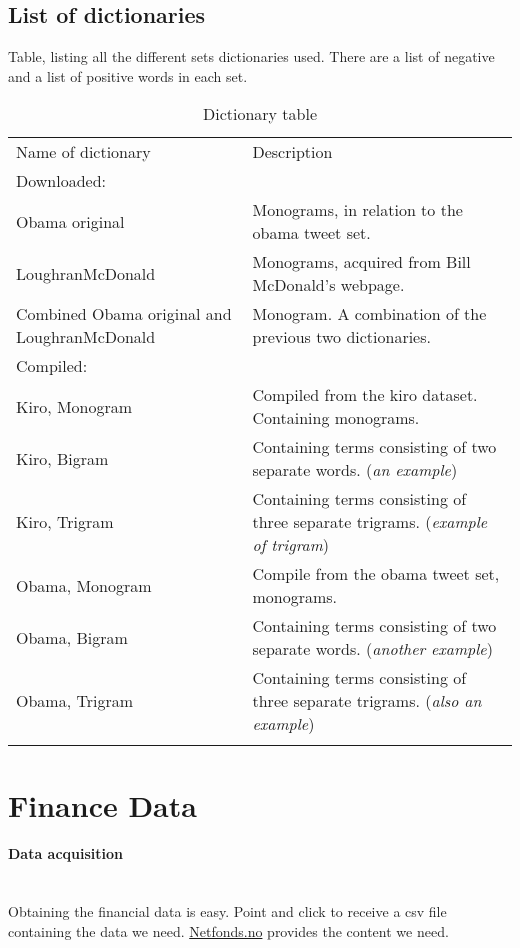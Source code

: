 \subsection{List of dictionaries}
Table, listing all the different sets dictionaries used. There are a list of
negative and a list of positive words in each set. 

\begin{table}
\centering
\label{tbl:dictionaries}
\caption{Dictionary table}
\begin{tabular}{ p{5cm} p{7cm} }
Name of dictionary & Description \\
Downloaded:& \\
\hline
Obama original & Monograms, in relation to the obama tweet set. \\
LoughranMcDonald & Monograms, acquired from Bill McDonald's webpage.\\
Combined Obama original and LoughranMcDonald & Monogram. A combination of
the previous two dictionaries. \\

Compiled:& \\
\hline
Kiro, Monogram & Compiled from the kiro dataset. Containing
monograms. \\
Kiro, Bigram &  Containing terms consisting of two separate words. (\textit{an 
example}) \\
Kiro, Trigram & Containing terms consisting of three separate trigrams.
(\textit{example of trigram})\\
Obama, Monogram & Compile from the obama tweet set, monograms. \\
Obama, Bigram & Containing terms consisting of two separate words.
(\textit{another example}) \\
Obama, Trigram & Containing terms consisting of three separate trigrams.
(\textit{also an example})\\

	\label{data:dictionary_list}
\end{tabular}
\end{table}
%

\section{Finance Data}\label{data:finance}

\paragraph{Data acquisition}
\hspace{0pt}\\
Obtaining the financial data is easy. Point and click to receive a csv file
containing the data we need. \url{Netfonds.no} provides the content we need.

